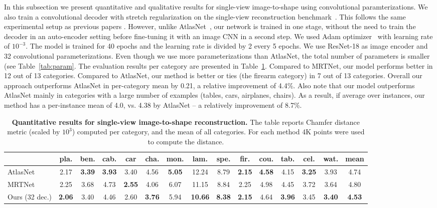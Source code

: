 In this subsection we present quantitative and qualitative results for single-view image-to-shape using convolutional paramterizations.
We also train a convolutional decoder with stretch regularization on the single-view reconstruction benchmark~\cite{choy20163d}.
This follows the same experimental setup as previous papers \cite{fan2016point, choy20163d, atlasnet, mrt18}.
However, unlike AtlasNet~\cite{atlasnet}, our network is trained in one stage, without the need to
train the decoder in an auto-encoder setting before fine-tuning it with an image CNN in a second step.
We used Adam optimizer~\cite{kingma2014adam} with learning rate of $10^{-3}$. 
The model is trained for 40 epochs and the learning rate is divided by 2 every 5 epochs.
We use ResNet-18 as image encoder and 32 convolutional parameterizations.
Even though we use more parameterizations than AtlasNet, the total number of parameters is smaller (see Table~\ref{tab:param}.
The evaluation results per category are presented in Table~\ref{tab:svr}.
Compared to MRTNet, our model performs better in 12 out of 13 categories. Compared to AtlasNet, our method is better or ties (the firearm category) in 7 out of 13 categories.
Overall our approach outperforms AtlasNet in per-category mean by 0.21, a relative improvement of 4.4\%. Also note that our model outperforms AtlasNet mainly in categories with
a large number of examples (tables, cars, airplanes, chairs). As a result, if average over instances, our method has a per-instance mean of 4.0, vs. 4.38 by AtlasNet -- a relatively improvement of  8.7\%.

\begin{table}[h!]
\centering
{
\scriptsize
  \begin{tabular}{l|c|c|c|c|c|c|c|c|c|c|c|c|c||c}
   &  pla. &  ben. &  cab. &  car &  cha. &  mon. &  lam. &  spe. &  fir. &  cou. &  tab. &  cel. &  wat. &  \textbf{mean} \\
  \hline
 AtlasNet~\cite{atlasnet} &
2.17 &
\textbf{3.39} &
\textbf{3.93} &
3.40 &
4.56 &
\textbf{5.05} &
12.24 &
8.79 &
\textbf{2.15} &
\textbf{4.58} &
4.15 &
\textbf{3.25} &
3.93 &
4.74\\
 
 MRTNet~\cite{mrt18} &
2.25 &
3.68 &
4.73 &
\textbf{2.55} &
4.06 &
6.07 &
11.15 &
8.84 &
2.25 &
4.98 &
4.45 &
3.72 &
3.64 &
4.80\\



Ours (32 dec.)&
\textbf{2.06} &
3.40 &
4.46 &
2.60 &
\textbf{3.76} &
5.94 &
\textbf{10.66} &
\textbf{8.38} &
\textbf{2.15} &
4.64 &
\textbf{3.96} &
3.45 &
\textbf{3.40} &
\textbf{4.53} \\
  \end{tabular}
  }
\caption{\small \textbf{Quantitative results for single-view image-to-shape reconstruction.} The table reports Chamfer distance metric (scaled by $10^3$) computed per category, and the mean of all categories.
For each method 4K points were used to compute the distance. %
  }
  \label{tab:svr}
\end{table}

